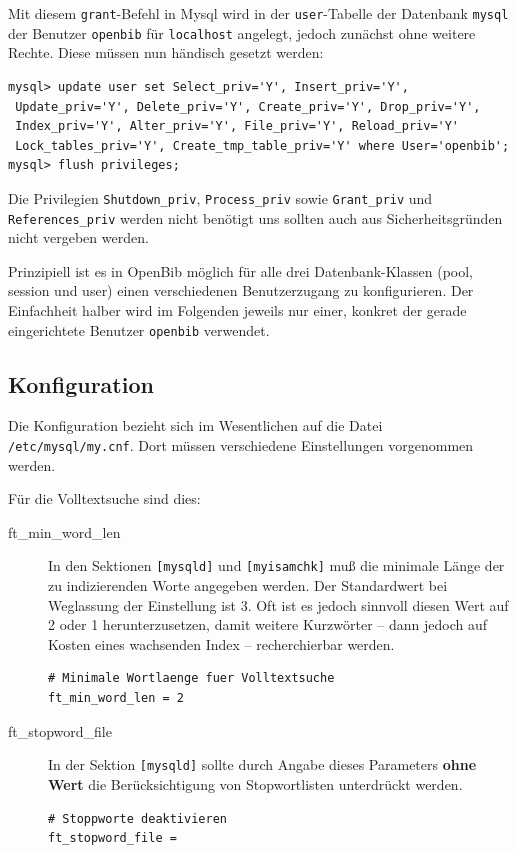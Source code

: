 \documentclass[11pt, twoside, a4paper, BCOR8mm, DIV12, bibtotoc,idxtotoc]{scrbook}
\begin{document}
Mit diesem \texttt{grant}-Befehl in Mysql wird in der
\texttt{user}-Tabelle der Datenbank \texttt{mysql} der Benutzer
\texttt{openbib} für \texttt{localhost} angelegt, jedoch zunächst
ohne weitere Rechte. Diese müssen nun händisch gesetzt werden:

\begin{verbatim}
mysql> update user set Select_priv='Y', Insert_priv='Y',
 Update_priv='Y', Delete_priv='Y', Create_priv='Y', Drop_priv='Y', 
 Index_priv='Y', Alter_priv='Y', File_priv='Y', Reload_priv='Y' 
 Lock_tables_priv='Y', Create_tmp_table_priv='Y' where User='openbib';
mysql> flush privileges;
\end{verbatim}

Die Privilegien \texttt{Shutdown\_priv},
\texttt{Process\_priv} sowie \texttt{Grant\_priv}
und \texttt{References\_priv} werden nicht benötigt uns sollten auch
aus Sicherheitsgründen nicht vergeben werden.

Prinzipiell ist es in OpenBib möglich für alle drei
Datenbank-Klassen (pool, session und user) einen verschiedenen
Benutzerzugang zu konfigurieren. Der Einfachheit halber wird im
Folgenden jeweils nur einer, konkret der gerade eingerichtete Benutzer
\texttt{openbib} verwendet.


\subsection{Konfiguration}

Die Konfiguration bezieht sich im Wesentlichen auf die Datei
\texttt{/etc/mysql/my.cnf}. Dort müssen verschiedene Einstellungen
vorgenommen werden.

Für die Volltextsuche sind dies:

\begin{description}
\item[ft\_min\_word\_len] In den Sektionen \texttt{[mysqld]} und
  \texttt{[myisamchk]} muß die minimale Länge der zu indizierenden
  Worte angegeben werden. Der Standardwert bei Weglassung der
  Einstellung ist 3. Oft ist es jedoch sinnvoll diesen Wert auf 2 oder
  1 herunterzusetzen, damit weitere Kurzwörter -- dann jedoch auf
  Kosten eines wachsenden Index -- recherchierbar werden.
\begin{verbatim}
# Minimale Wortlaenge fuer Volltextsuche
ft_min_word_len = 2
\end{verbatim}
\item[ft\_stopword\_file] In der Sektion \texttt{[mysqld]} sollte
  durch Angabe dieses Parameters \textbf{ohne Wert} die
  Berücksichtigung von Stopwortlisten unterdrückt werden.
\begin{verbatim}
# Stoppworte deaktivieren
ft_stopword_file =
\end{verbatim}
\end{description}
\end{document}
